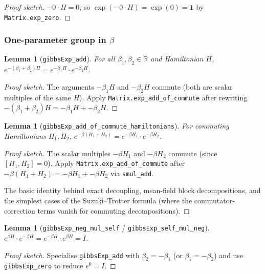 \documentclass[a4paper,11pt]{article}
\newtheorem{lemma}[theorem]{Lemma}
\begin{document}
\begin{proof}[Proof sketch]
$-0 \cdot H = 0$, so $\exp(-0 \cdot H) = \exp(0) = \mathbf{1}$ by
\texttt{Matrix.exp\_zero}.
\end{proof}

\subsubsection*{One-parameter group in $\beta$}

\begin{lemma}[\texttt{gibbsExp\_add}]
For all $\beta_1, \beta_2 \in \mathbb{R}$ and Hamiltonian $H$,
$e^{-(\beta_1 + \beta_2) H} = e^{-\beta_1 H} \cdot e^{-\beta_2 H}$.
\end{lemma}

\begin{proof}[Proof sketch]
The arguments $-\beta_1 H$ and $-\beta_2 H$ commute (both are scalar
multiples of the same $H$). Apply
\texttt{Matrix.exp\_add\_of\_commute} after rewriting
$-(\beta_1+\beta_2) H = -\beta_1 H + -\beta_2 H$.
\end{proof}

\begin{lemma}[\texttt{gibbsExp\_add\_of\_commute\_hamiltonians}]
For commuting Hamiltonians $H_1, H_2$,
$e^{-\beta (H_1 + H_2)} = e^{-\beta H_1} \cdot e^{-\beta H_2}$.
\end{lemma}

\begin{proof}[Proof sketch]
The scalar multiples $-\beta H_1$ and $-\beta H_2$ commute (since
$[H_1, H_2] = 0$).  Apply \texttt{Matrix.exp\_add\_of\_commute}
after $-\beta(H_1 + H_2) = -\beta H_1 + -\beta H_2$ via
\texttt{smul\_add}.

The basic identity behind exact decoupling, mean-field block
decompositions, and the simplest cases of the Suzuki–Trotter formula
(where the commutator-correction terms vanish for commuting
decompositions).
\end{proof}

\begin{lemma}[\texttt{gibbsExp\_neg\_mul\_self} / \texttt{gibbsExp\_self\_mul\_neg}]
$e^{\beta H} \cdot e^{-\beta H} = e^{-\beta H} \cdot e^{\beta H} = I$.
\end{lemma}

\begin{proof}[Proof sketch]
Specialise \texttt{gibbsExp\_add} with $\beta_2 = -\beta_1$ (or
$\beta_1 = -\beta_2$) and use \texttt{gibbsExp\_zero} to reduce
$e^{0} = I$.
\end{proof}
\end{document}
